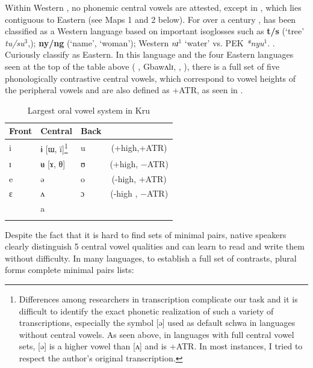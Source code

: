 \documentclass[output=paper,newtxmath,modfonts,nonflat,draft]{langsci/langscibook}
\begin{document}
Within Western , no phonemic central vowels are attested, except in , which lies contiguous to Eastern  (see Maps 1 and 2 below).  For over a century \citep{Delafosse1904},  has been classified as a Western  language based on important isoglosses such as \textbf{t/s} (‘tree’ \textit{tu/su$^3$},); \textbf{ny/ng} (‘name’, ‘woman’); Western \textit{nɪ}$^1$ ‘water’ vs. PEK \textit{*nyu}$^1$. \citep{Marchese1989}.  Curiously \citet{lewisetal2014} classify  as Eastern. In this language and the four Eastern languages seen at the top of the table above ( , Gbawʌlɪ, , ), there is a full set of five phonologically contrastive central vowels, which correspond to vowel heights of the peripheral vowels and are also defined as +ATR, as seen in .

\begin{table}
\begin{tabularx}{\textwidth}{XXXc}
\lsptoprule
Front & Central & Back\\
\midrule
i  &  ɨ [ɯ, ï]\footnote{Differences among researchers in transcription complicate our task and it is difficult to identify the exact phonetic realization of such a variety of transcriptions, especially the symbol [ə] used as default schwa in languages without central vowels. As seen above, in languages with full central vowel sets, [ə] is a higher vowel than [ʌ] and is +ATR. In most instances, I tried to respect the author’s original transcription.} & u  &  (+high,+ATR)\\

ɪ  &  ʉ [ɤ, θ]  & ʊ  &  (+high, −ATR) \\

e  &  ə  &  o  &  (-high, +ATR)\\

ɛ  &  ʌ  &  ɔ  &  (-high , −ATR) \\

& a\\
\lspbottomrule
\end{tabularx}	
\caption{Largest oral vowel system in Kru}
\label{tab:zogbo:5}
\end{table}

Despite the fact that it is hard to find  sets of minimal pairs, native speakers clearly distinguish 5 central vowel qualities and can learn to read and write them without difficulty. In many languages, to establish a full set of contrasts, plural forms complete minimal pairs lists: 
\end{document}
